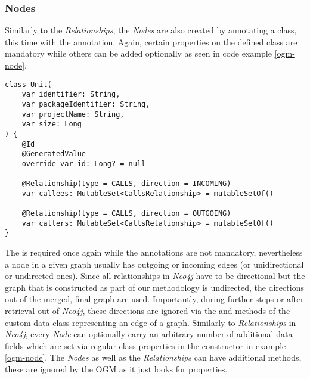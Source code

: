\documentclass[12pt,a4paper]{report}
\begin{document}
\subsubsection{Nodes}
Similarly to the \textit{Relationships}, the \textit{Nodes}
are also created by annotating a class, this time with the 
annotation. Again, certain properties on the defined class are
mandatory while others can be added optionally as seen in code example
\ref{ogm-node}.
\begin{lstlisting}[caption=Node OGM class, label=ogm-node, breaklines=true]
class Unit(
    var identifier: String,
    var packageIdentifier: String,
    var projectName: String,
    var size: Long
) {
    @Id
    @GeneratedValue
    override var id: Long? = null

    @Relationship(type = CALLS, direction = INCOMING)
    var callees: MutableSet<CallsRelationship> = mutableSetOf()

    @Relationship(type = CALLS, direction = OUTGOING)
    var callers: MutableSet<CallsRelationship> = mutableSetOf()
}
\end{lstlisting}
The  is
required once again while the  annotations are not
mandatory, nevertheless a node in a given graph usually has outgoing or
incoming edges (or unidirectional or undirected ones). Since all relationships
in \textit{Neo4j} have to be directional but the graph that is constructed as
part of our methodology is undirected, the directions out of the merged, final
graph are used. Importantly, during further steps or after retrieval out of
\textit{Neo4j}, these directions are ignored via the  and
 methods of the custom data class representing an edge of a graph.
Similarly to \textit{Relationships} in \textit{Neo4j}, every \textit{Node}
can optionally carry an arbitrary number of additional data fields which
are set via regular class properties in the constructor in example
\ref{ogm-node}. The \textit{Nodes} as well as the \textit{Relationships}
can have additional methods, these are ignored by the OGM as it just looks for
properties.
\end{document}
